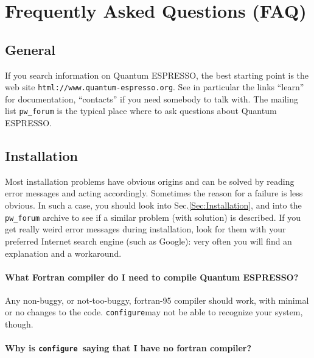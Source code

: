 \documentclass[12pt,a4paper]{article}
\def\qe{{\sc Quantum ESPRESSO}}
\def\configure{\texttt{configure}}
\begin{document}
\section{Frequently Asked Questions (FAQ)}

\subsection{General}

If you search information on \qe, the best starting point is the web site 
\texttt{html://www.quantum-espresso.org}. See in particular the
links ``learn'' for documentation, ``contacts'' if you need 
somebody to talk with. The mailing list \texttt{pw\_forum} is
the typical place where to ask questions about \qe.


\subsection{Installation}

Most installation problems have obvious origins and can be solved by reading
error messages and acting accordingly. Sometimes the reason for a failure
is less obvious. In such a case, you should look into 
Sec.\ref{Sec:Installation}, and into the \texttt{pw\_forum} archive to
see if a similar problem (with solution) is described. If you get
really weird error messages during installation, look for them with
your preferred Internet search engine (such as Google): very often you
will find an explanation and a workaround. 

\paragraph{What Fortran compiler do I need to compile \qe?}

Any non-buggy, or not-too-buggy, fortran-95 compiler should work,
with minimal or no changes to the code. \configure may not 
be able to recognize your system, though.

\paragraph{Why is \configure\ saying that I have no fortran compiler?}
\end{document}
